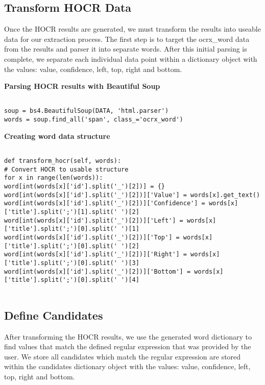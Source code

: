 \subsection{Transform HOCR Data}

Once the HOCR results are generated, we must transform the results
into useable data for our extraction process. The first step is to target
the ocrx_word data from the results and parser it into separate words.
After this initial parsing is complete, we separate each individual data
point within a dictionary object with the values: value, confidence, 
left, top, right and bottom.

\bigskip
\noindent
\textbf{Parsing HOCR results with Beautiful Soup}
\begin{footnotesize}
\begin{verbatim}

soup = bs4.BeautifulSoup(DATA, 'html.parser')
words = soup.find_all('span', class_='ocrx_word')

\end{verbatim}
\end{footnotesize}


\bigskip
\noindent
\textbf{Creating word data structure}
\begin{footnotesize}
\begin{verbatim}

def transform_hocr(self, words):
# Convert HOCR to usable structure
for x in range(len(words)):
word[int(words[x]['id'].split('_')[2])] = {}
word[int(words[x]['id'].split('_')[2])]['Value'] = words[x].get_text()
word[int(words[x]['id'].split('_')[2])]['Confidence'] = words[x]['title'].split(';')[1].split(' ')[2]
word[int(words[x]['id'].split('_')[2])]['Left'] = words[x]['title'].split(';')[0].split(' ')[1]
word[int(words[x]['id'].split('_')[2])]['Top'] = words[x]['title'].split(';')[0].split(' ')[2]
word[int(words[x]['id'].split('_')[2])]['Right'] = words[x]['title'].split(';')[0].split(' ')[3]
word[int(words[x]['id'].split('_')[2])]['Bottom'] = words[x]['title'].split(';')[0].split(' ')[4]


\end{verbatim}
\end{footnotesize}

\subsection{Define Candidates}

After transforming the HOCR results, we use the generated word dictionary 
to find values that match the defined regular expression that was provided
by the user. We store all candidates which match the regular expression are 
stored within the candidates dictionary object with the values: value, confidence, 
left, top, right and bottom.

